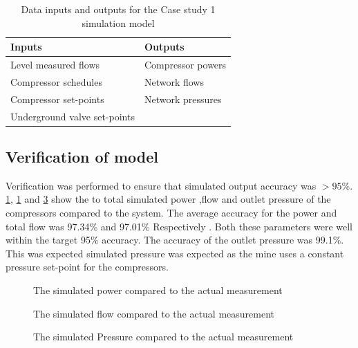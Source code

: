 \begin{table}[h]
	\centering
	\begin{tabular}{ll}
		\hline
		Inputs \hspace*{4cm}    &Outputs \hspace*{4cm}    \\  \hline
		Level measured flows&Compressor powers \\
		Compressor schedules& Network flows \\
		Compressor set-points& Network pressures \\
		Underground valve set-points&  \\
		\hline
	\end{tabular}
	\caption{Data inputs and outputs for the Case study 1 simulation model }
	\label{table: Mine A inputs/outputs}
\end{table}


\subsection{Verification of model}
Verification was performed to ensure that simulated output accuracy was $>95$\%. \cref{fig: Verification power Beatrix}, \cref{fig: Verification power Beatrix} and \cref{fig: Verification Pressure Beatrix} show the to total simulated power ,flow and outlet pressure of the compressors compared to the system. The average accuracy for the power and total flow was 97.34\%  and  97.01\% Respectively . Both these parameters were well within the target 95\% accuracy. The accuracy of the outlet pressure was 99.1\%. This was expected simulated pressure was expected as the mine uses a constant pressure set-point for the compressors.
\begin{figure}[h!]
	\centering
	
	\caption{The simulated power compared to the actual measurement}
	\label{fig: Verification power Beatrix}
\end{figure}
\begin{figure}[h!]
	\centering
	
	\caption{The simulated flow compared to the actual measurement}
	\label{fig: Verification flow Beatrix}
\end{figure}
\begin{figure}[h!]
	\centering
	
	\caption{The simulated Pressure compared to the actual measurement}
	\label{fig: Verification Pressure Beatrix}
\end{figure}


